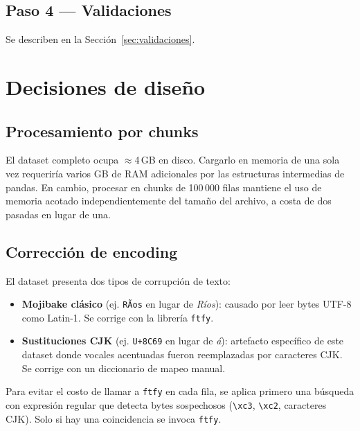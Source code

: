 \documentclass[11pt, letterpaper]{article}
\begin{document}
\subsection{Paso 4 --- Validaciones}

Se describen en la Sección~\ref{sec:validaciones}.

\section{Decisiones de diseño}

\subsection{Procesamiento por chunks}
\label{sec:chunks}

El dataset completo ocupa $\approx$4\,GB en disco. Cargarlo en memoria de
una sola vez requeriría varios GB de RAM adicionales por las estructuras
intermedias de pandas. En cambio, procesar en chunks de 100\,000 filas
mantiene el uso de memoria acotado independientemente del tamaño del archivo,
a costa de dos pasadas en lugar de una.

\subsection{Corrección de encoding}
\label{sec:encoding}

El dataset presenta dos tipos de corrupción de texto:

\begin{itemize}[noitemsep]
  \item \textbf{Mojibake clásico} (ej. \texttt{RÃ­os} en lugar de
    \textit{Ríos}): causado por leer bytes UTF-8 como Latin-1. Se corrige
    con la librería \texttt{ftfy}.
  \item \textbf{Sustituciones CJK} (ej. \texttt{U+8C69} en lugar de
    \textit{á}): artefacto específico de este dataset donde vocales
    acentuadas fueron reemplazadas por caracteres CJK. Se corrige con un
    diccionario de mapeo manual.
\end{itemize}

Para evitar el costo de llamar a \texttt{ftfy} en cada fila, se aplica
primero una búsqueda con expresión regular que detecta bytes sospechosos
(\texttt{\textbackslash xc3}, \texttt{\textbackslash xc2}, caracteres CJK).
Solo si hay una coincidencia se invoca \texttt{ftfy}.
\end{document}
